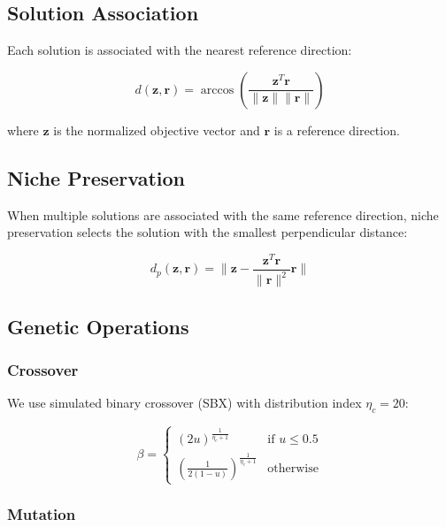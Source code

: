 \subsection{Solution Association}

Each solution is associated with the nearest reference direction:

\begin{equation}
d(\mathbf{z}, \mathbf{r}) = \arccos\left(\frac{\mathbf{z}^T \mathbf{r}}{\|\mathbf{z}\| \|\mathbf{r}\|}\right)
\end{equation}

where $\mathbf{z}$ is the normalized objective vector and $\mathbf{r}$ is a reference direction.

\subsection{Niche Preservation}

When multiple solutions are associated with the same reference direction, niche preservation selects the solution with the smallest perpendicular distance:

\begin{equation}
d_p(\mathbf{z}, \mathbf{r}) = \|\mathbf{z} - \frac{\mathbf{z}^T \mathbf{r}}{\|\mathbf{r}\|^2} \mathbf{r}\|
\end{equation}

\subsection{Genetic Operations}

\subsubsection{Crossover}

We use simulated binary crossover (SBX) with distribution index $\eta_c = 20$:

\begin{equation}
\beta = \begin{cases}
(2u)^{\frac{1}{\eta_c + 1}} & \text{if } u \leq 0.5 \\
\left(\frac{1}{2(1-u)}\right)^{\frac{1}{\eta_c + 1}} & \text{otherwise}
\end{cases}
\end{equation}

\subsubsection{Mutation}

